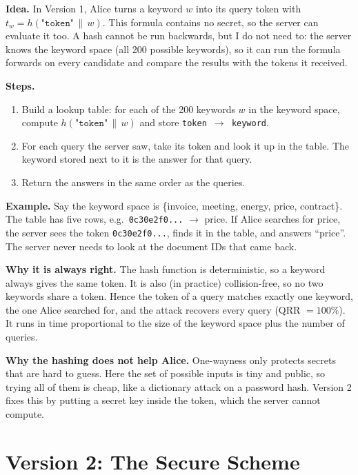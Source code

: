 \documentclass[12pt]{article}
\begin{document}
\begin{answer}
    \textbf{Idea.}
    In Version 1, Alice turns a keyword $w$ into its query token with $t_w = h(\texttt{"token"} \,\|\, w)$.
    This formula contains no secret, so the server can evaluate it too.
    A hash cannot be run backwards, but I do not need to: the server knows the keyword space (all 200 possible keywords), so it can run the formula forwards on every candidate and compare the results with the tokens it received.

    \textbf{Steps.}
    \begin{enumerate}
        \item Build a lookup table: for each of the 200 keywords $w$ in the keyword space, compute $h(\texttt{"token"} \,\|\, w)$ and store \texttt{token $\to$ keyword}.
        \item For each query the server saw, take its token and look it up in the table.
        The keyword stored next to it is the answer for that query.
        \item Return the answers in the same order as the queries.
    \end{enumerate}

    \textbf{Example.}
    Say the keyword space is \{invoice, meeting, energy, price, contract\}.
    The table has five rows, e.g.\ \texttt{0c30e2f0...} $\to$ price.
    If Alice searches for price, the server sees the token \texttt{0c30e2f0...}, finds it in the table, and answers ``price''.
    The server never needs to look at the document IDs that came back.

    \textbf{Why it is always right.}
    The hash function is deterministic, so a keyword always gives the same token.
    It is also (in practice) collision-free, so no two keywords share a token.
    Hence the token of a query matches exactly one keyword, the one Alice searched for, and the attack recovers every query (QRR $=100\%$).
    It runs in time proportional to the size of the keyword space plus the number of queries.

    \textbf{Why the hashing does not help Alice.}
    One-wayness only protects secrets that are hard to guess.
    Here the set of possible inputs is tiny and public, so trying all of them is cheap, like a dictionary attack on a password hash.
    Version 2 fixes this by putting a secret key inside the token, which the server cannot compute.
\end{answer}

\Needspace{9cm}
\section{Version 2: The Secure Scheme}
\end{document}
